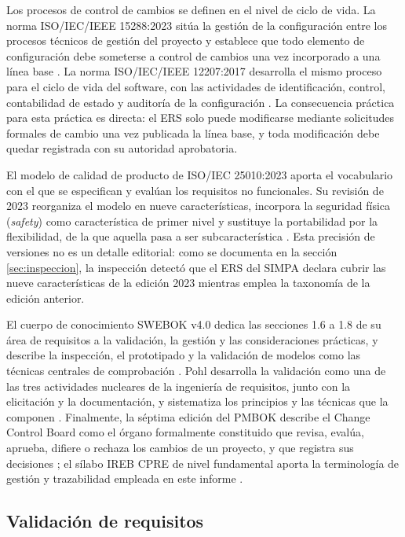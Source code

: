 \documentclass[11pt,letterpaper]{article}
\begin{document}
Los procesos de control de cambios se definen en el nivel de ciclo de vida. La norma
ISO/IEC/IEEE 15288:2023 sitúa la gestión de la configuración entre los procesos técnicos de gestión
del proyecto y establece que todo elemento de configuración debe someterse a control de cambios una
vez incorporado a una línea base \cite{iso15288}. La norma ISO/IEC/IEEE 12207:2017 desarrolla el
mismo proceso para el ciclo de vida del software, con las actividades de identificación,
control, contabilidad de estado y auditoría de la configuración \cite{iso12207}. La consecuencia
práctica para esta práctica es directa: el ERS solo puede modificarse mediante solicitudes formales
de cambio una vez publicada la línea base, y toda modificación debe quedar registrada con su
autoridad aprobatoria.

El modelo de calidad de producto de ISO/IEC 25010:2023 aporta el vocabulario con el que se
especifican y evalúan los requisitos no funcionales. Su revisión de 2023 reorganiza el modelo en
nueve características, incorpora la seguridad física (\emph{safety}) como característica de primer
nivel y sustituye la portabilidad por la flexibilidad, de la que aquella pasa a ser
subcaracterística \cite{iso25010}. Esta precisión de versiones no es un detalle editorial: como se
documenta en la sección \ref{sec:inspeccion}, la inspección detectó que el ERS del SIMPA declara
cubrir las nueve características de la edición 2023 mientras emplea la taxonomía de la edición
anterior.

El cuerpo de conocimiento SWEBOK v4.0 dedica las secciones 1.6 a 1.8 de su área de requisitos a la
validación, la gestión y las consideraciones prácticas, y describe la inspección, el prototipado y
la validación de modelos como las técnicas centrales de comprobación \cite{swebok4}. Pohl desarrolla
la validación como una de las tres actividades nucleares de la ingeniería de requisitos, junto con
la elicitación y la documentación, y sistematiza los principios y las técnicas que la componen
\cite{pohl2025}. Finalmente, la séptima edición del PMBOK describe el Change Control Board como el
órgano formalmente constituido que revisa, evalúa, aprueba, difiere o rechaza los cambios de un
proyecto, y que registra sus decisiones \cite{pmbok7}; el sílabo IREB CPRE de nivel fundamental
aporta la terminología de gestión y trazabilidad empleada en este informe \cite{ireb31}.

\subsection{Validación de requisitos}
\end{document}
